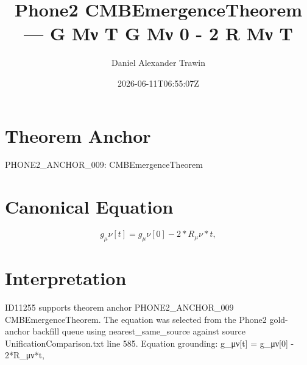 \documentclass[11pt]{article}
\title{Phone2 CMBEmergenceTheorem — G Μν T G Μν 0 - 2 R Μν T}
\author{Daniel Alexander Trawin}
\date{2026-06-11T06:55:07Z}
\begin{document}
\maketitle
\section*{Theorem Anchor}
PHONE2_ANCHOR_009: CMBEmergenceTheorem
\section*{Canonical Equation}
\[
g_μν[t] = g_μν[0] - 2*R_μν*t,
\]
\section*{Interpretation}
ID11255 supports theorem anchor PHONE2_ANCHOR_009 CMBEmergenceTheorem. The equation was selected from the Phone2 gold-anchor backfill queue using nearest_same_source against source UnificationComparison.txt line 585. Equation grounding: g_μν[t] = g_μν[0] - 2*R_μν*t,
\end{document}
